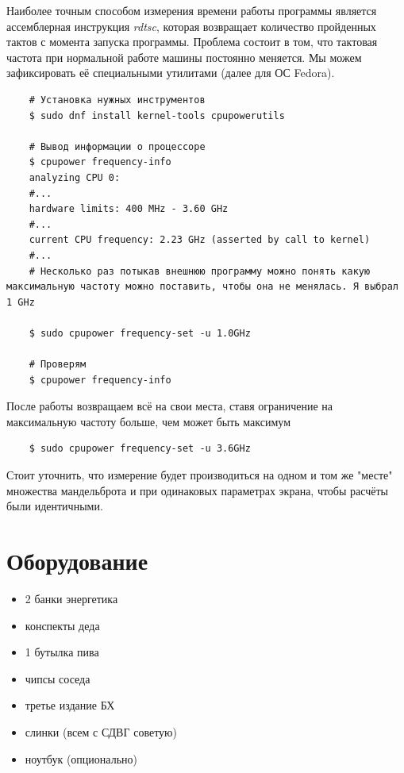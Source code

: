 \documentclass[12pt,a4paper]{article}
\begin{document}
Наиболее точным способом измерения времени работы программы является ассемблерная инструкция \textit{rdtsc}, которая возвращает количество пройденных тактов с момента запуска программы. Проблема состоит в том, что тактовая частота при нормальной работе машины постоянно меняется. Мы можем зафиксировать её специальными утилитами (далее для ОС Fedora).

\begin{verbatim}
    # Установка нужных инструментов
    $ sudo dnf install kernel-tools cpupowerutils

    # Вывод информации о процессоре
    $ cpupower frequency-info
    analyzing CPU 0:
    #...
    hardware limits: 400 MHz - 3.60 GHz
    #...
    current CPU frequency: 2.23 GHz (asserted by call to kernel)
    #...
    # Несколько раз потыкав внешнюю программу можно понять какую максимальную частоту можно поставить, чтобы она не менялась. Я выбрал 1 GHz

    $ sudo cpupower frequency-set -u 1.0GHz

    # Проверям
    $ cpupower frequency-info

\end{verbatim}

После работы возвращаем всё на свои места, ставя ограничение на максимальную частоту больше, чем может быть максимум

\begin{verbatim}
    $ sudo cpupower frequency-set -u 3.6GHz
\end{verbatim}

Стоит уточнить, что измерение будет производиться на одном и том же "месте" множества мандельброта и при одинаковых параметрах экрана, чтобы расчёты были идентичными.

\section{Оборудование}

\begin{itemize}
    \item 2 банки энергетика
    \item конспекты деда
    \item 1 бутылка пива
    \item чипсы соседа
    \item третье издание БХ
    \item слинки (всем с СДВГ советую)
    \item ноутбук (опционально)
\end{itemize}
\end{document}

